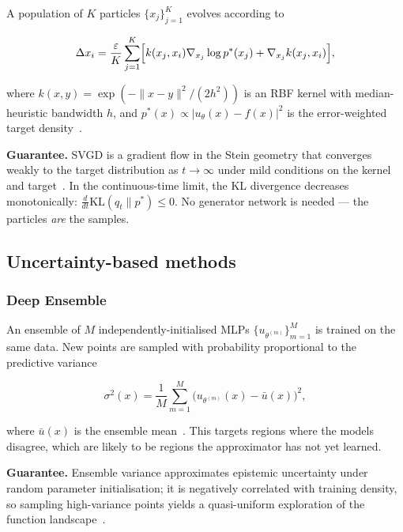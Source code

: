 \documentclass[11pt,a4paper]{article}
\begin{document}
A population of $K$ particles $\{x_j\}_{j=1}^K$ evolves according to

\begin{equation}
  \Delta x_i = \frac{\varepsilon}{K}\sum_{j=1}^K\Bigl[
    k(x_j,x_i)\nabla_{x_j}\log p^*(x_j) +
    \nabla_{x_j}k(x_j,x_i) \Bigr],
\end{equation}

where $k(x,y)=\exp(-\|x-y\|^2/(2h^2))$ is an RBF kernel with
median-heuristic bandwidth $h$, and
$p^*(x)\propto |u_\theta(x)-f(x)|^2$ is the error-weighted target
density~\citep{liu2016stein}.

\textbf{Guarantee.}
SVGD is a gradient flow in the Stein geometry that converges weakly to
the target distribution as $t\to\infty$ under mild conditions on the
kernel and target~\citep{liu2017stein}.  In the continuous-time limit,
the KL divergence decreases monotonically:
$\frac{d}{dt}\mathrm{KL}(q_t\|p^*) \le 0$.
No generator network is needed --- the particles \emph{are} the samples.

\subsection{Uncertainty-based methods}
\label{sec:uncertainty}

\subsubsection{Deep Ensemble}
\label{sec:ensemble}

An ensemble of $M$ independently-initialised MLPs
$\{u_{\theta^{(m)}}\}_{m=1}^M$ is trained on the same data.
New points are sampled with probability proportional to the predictive
variance

\begin{equation}
  \sigma^2(x) = \frac1M\sum_{m=1}^M
    \bigl(u_{\theta^{(m)}}(x) - \bar u(x)\bigr)^2,
\end{equation}

where $\bar u(x)$ is the ensemble mean~\citep{lakshminarayanan2017simple}.
This targets regions where the models disagree, which are likely to be
regions the approximator has not yet learned.

\textbf{Guarantee.}
Ensemble variance approximates epistemic uncertainty under random
parameter initialisation; it is negatively correlated with training
density, so sampling high-variance points yields a quasi-uniform
exploration of the function landscape~\citep{osband2018randomized}.
\end{document}
